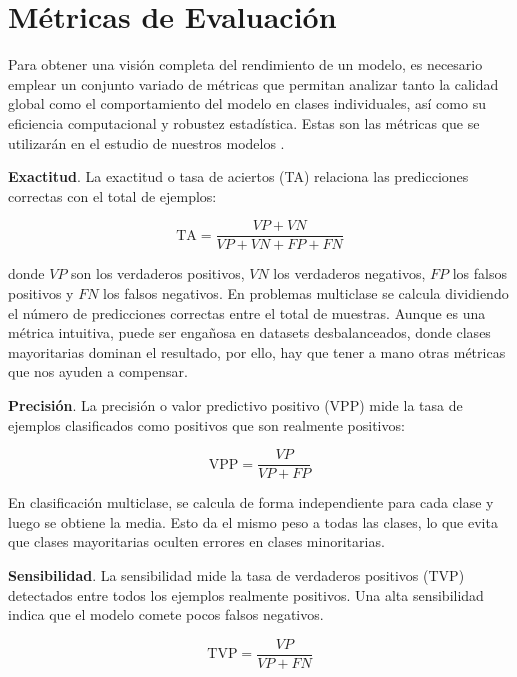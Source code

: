 \section{Métricas de Evaluación}

Para obtener una visión completa del rendimiento de un modelo, es necesario emplear un conjunto variado de métricas que permitan analizar tanto la calidad global como el comportamiento del modelo en clases individuales, así como su eficiencia computacional y robustez estadística. Estas son las métricas que se utilizarán en el estudio de nuestros modelos \cite{dl_fundamentos__casas_roma_2020}.

\textbf{Exactitud}. La exactitud o tasa de aciertos (TA) relaciona las predicciones correctas con el total de ejemplos:

\begin{equation}
	\text{TA} = \frac{VP + VN}{VP + VN + FP + FN}
	\label{eq:exactitud}
\end{equation}

donde $VP$ son los verdaderos positivos, $VN$ los verdaderos negativos, $FP$ los falsos positivos y $FN$ los falsos negativos. En problemas multiclase se calcula dividiendo el número de predicciones correctas entre el total de muestras. Aunque es una métrica intuitiva, puede ser engañosa en datasets desbalanceados, donde clases mayoritarias dominan el resultado, por ello, hay que tener a mano otras métricas que nos ayuden a compensar.

\textbf{Precisión}. La precisión o valor predictivo positivo (VPP) mide la tasa de ejemplos clasificados como positivos que son realmente positivos:

\begin{equation}
	\text{VPP} = \frac{VP}{VP + FP}
	\label{eq:precision}
\end{equation}

En clasificación multiclase, se calcula de forma independiente para cada clase y luego se obtiene la media. Esto da el mismo peso a todas las clases, lo que evita que clases mayoritarias oculten errores en clases minoritarias.

\textbf{Sensibilidad}. La sensibilidad mide la tasa de verdaderos positivos (TVP) detectados entre todos los ejemplos realmente positivos. Una alta sensibilidad indica que el modelo comete pocos falsos negativos.

\begin{equation}
	\text{TVP} = \frac{VP}{VP + FN}
	\label{eq:sensibilidad}
\end{equation}

